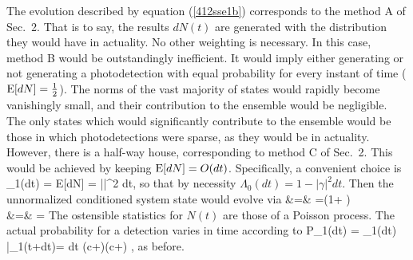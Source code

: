 The evolution described by equation (\ref{412sse1b}) corresponds to the method A of
Sec.~2. That is to say, the results $dN(t)$ are generated with the
distribution they would have in actuality. No other weighting is necessary. In this
case, method B would be outstandingly inefficient. It would imply either generating
or not generating a photodetection with equal probability for every instant of time
(${\rm E}[dN]=\mbox{$\frac{1}{2}$}$). The norms of the vast majority of states would rapidly become
vanishingly small, and their contribution to the ensemble would be negligible. The
only states which would significantly contribute to the ensemble would be those in
which photodetections were sparse, as they would be in actuality. However, there is a
half-way house, corresponding to method C of Sec.~2. This would be achieved by
keeping ${\rm E}[dN]=O(dt)$. Specifically, a convenient choice is \beq
\Lambda_1(dt) = {\rm E}[dN] = |\gamma|^2 dt,
\eeq
so that by necessity $\Lambda_0(dt) = 1 - |\gamma|^2 dt$.
Then the unnormalized conditioned system state would evolve via
\bqa
{} &=&
=\left(1+
\right)  \\ 
 &=&
= 
\eqa
The ostensible statistics for $N(t)$ are those of a Poisson process. 
The actual probability for a detection varies in time according to
\beq
P_1(dt) = \Lambda_1(dt)  
\bar\psi_1(t+dt)\rangle = dt 
(c+\gamma)\dg (c+\gamma) ,
\eeq
as before.

